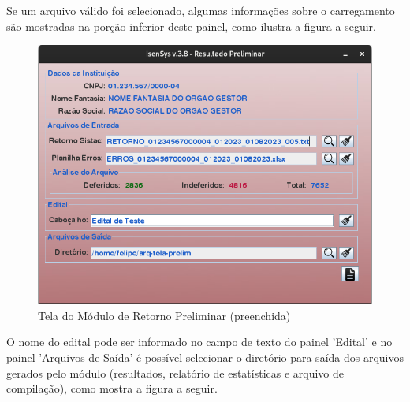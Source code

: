 \documentclass[
	12pt,			%
	openright,		%
	oneside,	
	a4paper,		%
	english,		%
	brazil			%
]{abntex2/abntex2}  %
\begin{document}
					Se um arquivo válido foi selecionado, algumas informações sobre o carregamento são mostradas na porção inferior deste painel, como ilustra a figura a seguir.
		
					\begin{figure}[ht]
						\begin{center}
							
							\caption{Tela do Módulo de Retorno Preliminar (preenchida)}
							\label{retorno-prelim-ui-processed}
							
							\includegraphics[scale=0.5]{img/retorno-prelim-ui-processed}
							
						\end{center}
					\end{figure}
		
					O nome do edital pode ser informado no campo de texto do painel 'Edital' e no painel 'Arquivos de Saída' é possível selecionar o diretório para saída dos arquivos gerados pelo módulo (resultados, relatório de estatísticas e arquivo de compilação), como mostra a figura a seguir.
		
\end{document}
